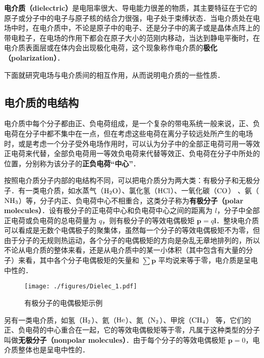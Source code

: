 
\begin{issues}
\end{issues}


\textbf{电介质（dielectric）}是电阻率很大、导电能力很差的物质，其主要特征在于它的原子或分子中的电子与原子核的结合力很强，电子处于束缚状态．当电介质处在电场中时，在电介质中，不论是原子中的电子、还是分子中的离子或是晶体点阵上的带电粒子，在电场的作用下都会在原子大小的范刚内移动，当达到静电平衡时，在电介质表面层或在体内会出现极化电荷，这个现象称作电介质的\textbf{极化（polarization）}．

下面就研究电场与电介质间的相互作用，从而说明电介质的一些性质．

\subsection{电介质的电结构}

电介质中每个分子都由正、负电荷组成，是一个复杂的带电系统一般来说，正、负电荷在分子中都不集中在一点，但在考虑这些电荷在离分子较远处所产生的电场时，或是考虑一个分子受外电场作用时，可以认为分子中的全部正电荷可用一等效正电荷来代替，全部负电荷用一等效负电荷来代替等效正、负电荷在分子中所处的位置，分别称为该分子的\textbf{正负电荷“中心”}．

按照电介质分子内部的电结构不同，可以把电介质分为两大类：有极分子和无极分子．有一类电介质，如水蒸气（$\rm H_2O$）、氯化氢（$\rm HCl$）、一氧化碳（$\rm CO$） 、氨（$\rm NH_3$）等，分子内正、负电荷中心不相重合，这类分子称为\textbf{有极分子（polar molecules）}．设有极分子的正电荷中心和负电荷中心之间的距离为 $l$，分子中全部正电荷或负电荷的总电荷量为 $q$，则有极分子的等效电偶极矩 $\mathbf p=q\mathbf l$．整块电介质可以看成是无数个电偶极子的聚集体，虽然每一个分子的等效电偶极矩不为零，但由于分子的无规则热运动，各个分子的电偶极矩的方向是杂乱无章地排列的，所以不论从电介质的整体来看，还是从电介质中的某一小体积（其中包含有大量的分子）来看，其中各个分子电偶极矩的矢量和 $\sum \mathbf p$ 平均说来等于零，电介质是呈电中性的．
\begin{figure}[ht]
\centering
\texttt{[image: ./figures/Dielec\_1.pdf]}
\caption{有极分子的电偶极矩示例} \label{Dielec_fig1}
\end{figure}
另有一类电介质，如氢（$\rm H_2$）、氦（$\rm He$）、氮（$\rm N_2$）、甲烷（$\rm CH_4$） 等，它们的正、负电荷的中心重合在一起，它的等效电偶极矩等于零，凡属于这种类型的分子叫做\textbf{无极分子（nonpolar molecules）}．由于每个分子的等效电偶极矩 $\mathbf p=0$，电介质整体也是呈电中性的．

